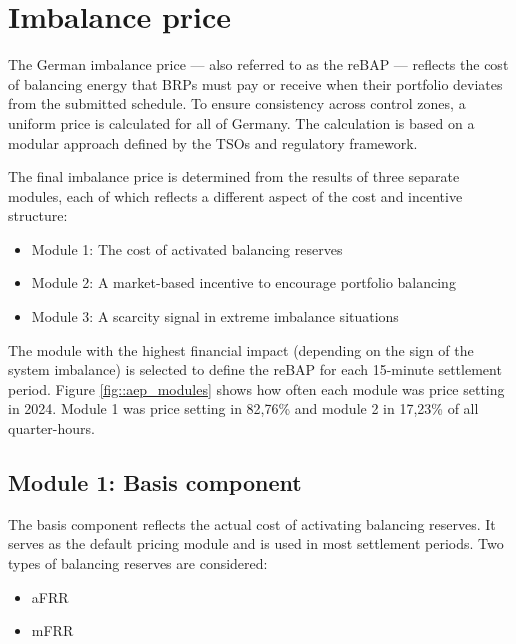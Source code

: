 \documentclass[class=scrbook, crop=false]{standalone}
\begin{document}



\section{Imbalance price}
\label{Section::Imbalance_Price}
The German imbalance price — also referred to as the \gls{reBAP} — reflects the cost of balancing energy that \gls{BRP}s must pay or receive when their portfolio deviates from the submitted schedule.
To ensure consistency across control zones, a uniform price is calculated for all of Germany. The calculation is based on a modular approach defined by the \gls{TSO}s and regulatory framework.

The final imbalance price is determined from the results of three separate modules, each of which reflects a different aspect of the cost and incentive structure:
\begin{itemize}
\item Module 1: The cost of activated balancing reserves
\item Module 2: A market-based incentive to encourage portfolio balancing
\item Module 3: A scarcity signal in extreme imbalance situations
\end{itemize}
The module with the highest financial impact (depending on the sign of the system imbalance) is selected to define the \gls{reBAP} for each 15-minute settlement period. Figure \ref{fig::aep_modules} shows how often each module was price setting in 2024. Module 1 was price setting in 82,76\% and module 2 in 17,23\% of all quarter-hours.

\subsection{Module 1: Basis component}
The basis component reflects the actual cost of activating balancing reserves. It serves as the default pricing module and is used in most settlement periods.
Two types of balancing reserves are considered:
\begin{itemize}
\item \gls{aFRR} 
\item \gls{mFRR} 
\end{itemize}
\end{document}
